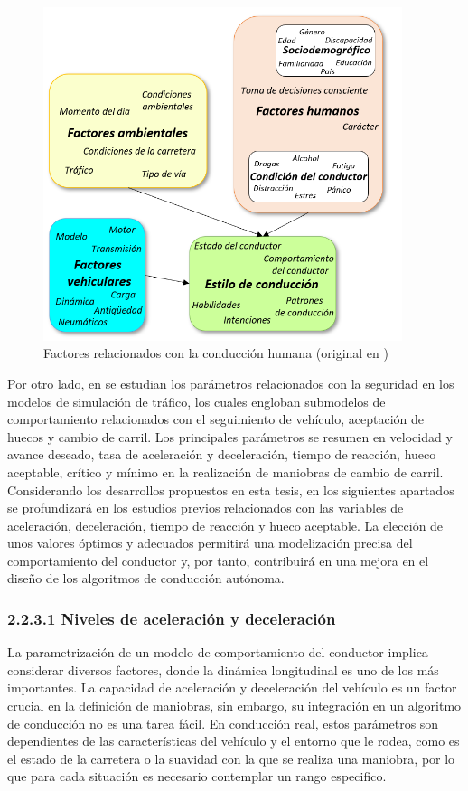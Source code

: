 \begin{figure}[h]
    \centering
    \includegraphics[width=10.5cm]
    {figures/2.5.png}
    \caption{ \label{fig:2.5} Factores relacionados con la conducción humana (original en \cite{jimenez17})}
\end{figure}

Por otro lado, en \textcite{bonsall} se estudian los parámetros relacionados con la seguridad en los modelos de simulación de tráfico, los cuales engloban submodelos de comportamiento relacionados con el seguimiento de vehículo, aceptación de huecos y cambio de carril. Los principales parámetros se resumen en velocidad y avance deseado, tasa de aceleración y deceleración, tiempo de reacción, hueco aceptable, crítico y mínimo en la realización de maniobras de cambio de carril.
Considerando los desarrollos propuestos en esta tesis, en los siguientes apartados se profundizará en los estudios previos relacionados con las variables de aceleración, deceleración, tiempo de reacción y hueco aceptable. La elección de unos valores óptimos y adecuados permitirá una modelización precisa del comportamiento del conductor y, por tanto, contribuirá en una mejora en el diseño de los algoritmos de conducción autónoma.

\subsubsection{2.2.3.1	Niveles de aceleración y deceleración}

La parametrización de un modelo de comportamiento del conductor implica considerar diversos factores, donde la dinámica longitudinal es uno de los más importantes. La capacidad de aceleración y deceleración del vehículo es un factor crucial en la definición de maniobras, sin embargo, su integración en un algoritmo de conducción no es una tarea fácil. En conducción real, estos parámetros son dependientes de las características del vehículo y el entorno que le rodea, como es el estado de la carretera o la suavidad con la que se realiza una maniobra, por lo que para cada situación es necesario contemplar un rango especifico. 

